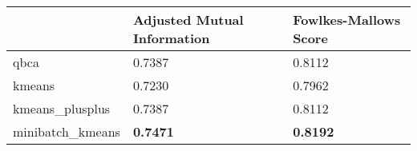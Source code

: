 \begin{table}[htbp]
\centering
\begin{tabular}{lll}
\toprule
 & Adjusted Mutual Information & Fowlkes-Mallows Score \\
\midrule
qbca & 0.7387 & 0.8112 \\
kmeans & 0.7230 & 0.7962 \\
kmeans_plusplus & 0.7387 & 0.8112 \\
minibatch_kmeans & \textbf{0.7471} & \textbf{0.8192} \\
\bottomrule
\end{tabular}
\end{table}
